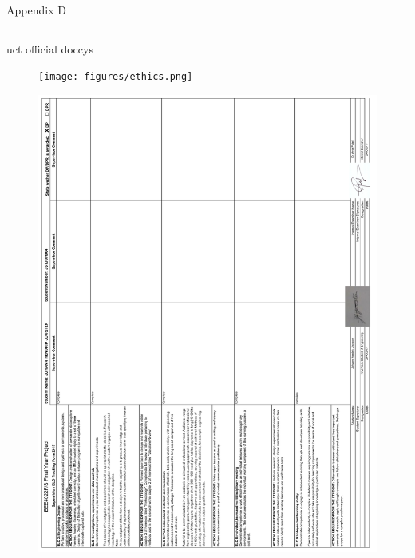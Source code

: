 \pagestyle{plain}


{\Large Appendix D}
\vskip 5mm
\hrule
\vskip 5mm


uct official doccys

\newpage
\begin{figure}[!ht] 
\captionsetup{width=1\linewidth, font=small}  
\texttt{[image: figures/ethics.png]}
\label{fig:ethics}
\end{figure}

\newpage
\begin{figure}[!ht] 
\captionsetup{width=1\linewidth, font=small}  
\includegraphics[width=1\linewidth]{figures/elo.png}
\label{fig:elo}
\end{figure}